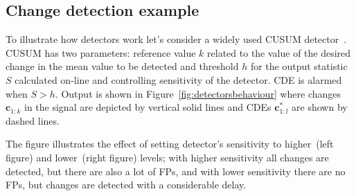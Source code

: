 \subsection{Change detection example}
To illustrate how detectors work let's consider a widely used CUSUM detector~\cite{Page1954}.
CUSUM has two parameters: reference value $k$ related to the value of the desired change in the mean value to be detected and threshold $h$ for the output statistic $S$ calculated on-line and controlling sensitivity of the detector.
CDE is alarmed when $S > h$.
Output is shown in Figure~\ref{fig:detectorsbehaviour} where changes $\pmb{c}_{1:k}$ in the signal are depicted by vertical solid lines and CDEs $\pmb{c}_{1:l}^\ast$ are shown by dashed lines.

The figure illustrates the effect of setting detector's sensitivity to higher~(left figure) and lower~(right figure) levels; with higher sensitivity all changes are detected, but there are also a lot of FPs, and with lower sensitivity there are no FPs, but changes are detected with a considerable delay.

